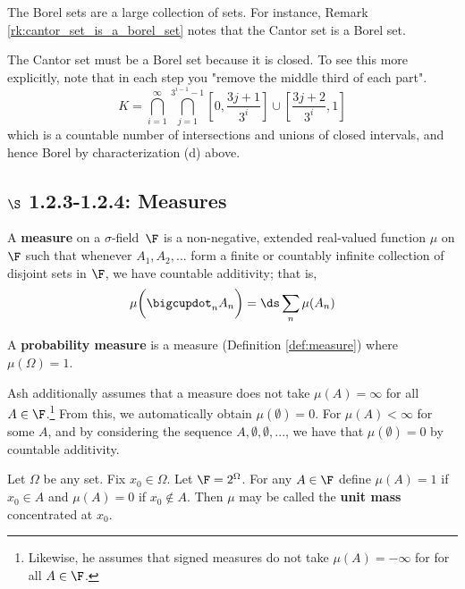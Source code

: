 \documentclass{article} %
\renewcommand{\sf}{$\sigma$-field}
\begin{document}
The Borel sets are a large collection of sets.  For instance, Remark \ref{rk:cantor_set_is_a_borel_set} notes that the Cantor set is a Borel set. 

\begin{remark}{}
The Cantor set must be a Borel set because it is closed.  To see this more explicitly, note that in each step you "remove the middle third of each part".  
\[K = \bigcap_{i=1}^\infty\bigcap_{j=1}^{3^{i-1}-1}\left[0,\frac{3j+1}{3^i}\right]\cup \left[\frac{3j+2}{3^i}, 1\right] \]
which is a countable number of intersections and unions of closed intervals, and hence Borel by characterization (d) above. 
\label{rk:cantor_set_is_a_borel_set}
\end{remark}

\subsection{$\S$ 1.2.3-1.2.4: Measures}




\begin{definition}
A \textbf{measure} on a \sf\ $\F$ is a non-negative, extended real-valued function $\mu$ on $\F$ such that whenever $A_1, A_2, ...$ form a finite or countably infinite collection of disjoint sets in $\F$, we have countable additivity; that is,
\[ \mu \bigg( \bigcupdot_n A_n \bigg) = \ds\sum_n \mu(A_n) \]
\label{def:measure}	
\end{definition}

\begin{definition}
A \textbf{probability measure} is a measure (Definition \ref{def:measure}) where $\mu(\Omega)=1$.
\label{def:prob_measure}		
\end{definition}

\begin{remark}
Ash additionally assumes that a measure does not take $\mu(A) = \infty$ for all $A \in \F$.\footnote{Likewise, he assumes that signed measures do not take $\mu(A) = -\infty$ for  for all $A \in \F$.}  From this, we automatically obtain $\mu(\emptyset)=0$. For $\mu(A) < \infty$ for some $A$, and by considering the sequence $A, \emptyset, \emptyset, ...$, we have that $\mu(\emptyset)=0$ by countable additivity.   	
\end{remark}

\begin{example}
Let $\Omega$ be any set.  Fix $x_0 \in \Omega$.  Let $\F = 2^\Omega$.  For any $A \in \F$ define $\mu(A) = 1$ if $x_0 \in A$ and $\mu(A) = 0$ if $x_0 \not\in A$.  Then $\mu$ may be called the \textbf{unit mass} concentrated at $x_0$.
\end{example}
\end{document}
